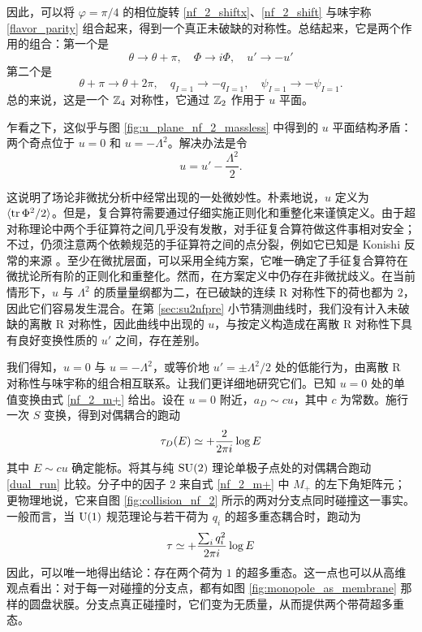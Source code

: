 因此，可以将 $\varphi=\pi/4$ 的相位旋转 \eqref{nf_2_shiftx}、\eqref{nf_2_shift} 与味宇称 \eqref{flavor_parity} 组合起来，得到一个真正未破缺的对称性。总结起来，它是两个作用的组合：第一个是
\begin{equation}
\theta\to\theta+\pi,\quad\Phi\to i\Phi,\quad u'\to-u'
\end{equation}
第二个是
\begin{equation}
\theta+\pi\to\theta+2\pi,\quad q_{I=1}\to-q_{I=1},\quad\psi_{I=1}\to-\psi_{I=1}.
\end{equation}
总的来说，这是一个 $\mathbb{Z}_4$ 对称性，它通过 $\mathbb{Z}_2$ 作用于 $u$ 平面。

乍看之下，这似乎与图 \ref{fig:u_plane_nf_2_massless} 中得到的 $u$ 平面结构矛盾：两个奇点位于 $u=0$ 和 $u=-\Lambda^2$。解决办法是令
\begin{equation}
u=u'-\frac{\Lambda^2}{2}.\label{ushift}
\end{equation}

这说明了场论非微扰分析中经常出现的一处微妙性。朴素地说，$u$ 定义为 $\langle\mathop{\mathrm{tr}}\nolimits\Phi^2/2\rangle$。但是，复合算符需要通过仔细实施正则化和重整化来谨慎定义。由于超对称理论中两个手征算符之间几乎没有发散，对手征复合算符做这件事相对安全；不过，仍须注意两个依赖规范的手征算符之间的点分裂，例如它已知是 Konishi 反常的来源 \cite{Konishi:1983hf}。至少在微扰层面，可以采用全纯方案，它唯一确定了手征复合算符在微扰论所有阶的正则化和重整化。然而，在方案定义中仍存在非微扰歧义。在当前情形下，$u$ 与 $\Lambda^2$ 的质量量纲都为二，在已破缺的连续 R 对称性下的荷也都为 $2$，因此它们容易发生混合。在第 \ref{sec:su2nfpre} 小节猜测曲线时，我们没有计入未破缺的离散 R 对称性，因此曲线中出现的 $u$，与按定义构造成在离散 R 对称性下具有良好变换性质的 $u'$ 之间，存在差别。

我们得知，$u=0$ 与 $u=-\Lambda^2$，或等价地 $u'=\pm\Lambda^2/2$ 处的低能行为，由离散 R 对称性与味宇称的组合相互联系。让我们更详细地研究它们。已知 $u=0$ 处的单值变换由式 \eqref{nf_2_m+} 给出。设在 $u=0$ 附近，$a_D\sim cu$，其中 $c$ 为常数。施行一次 $S$ 变换，得到对偶耦合的跑动
\begin{equation}
\tau_D(E)\simeq+\frac{2}{2\pi i}\log E
\end{equation}
其中 $E\sim cu$ 确定能标。将其与纯 $\mathop{\mathrm{SU}}(2)$ 理论单极子点处的对偶耦合跑动 \eqref{dual_run} 比较。分子中的因子 $2$ 来自式 \eqref{nf_2_m+} 中 $M_+$ 的左下角矩阵元；更物理地说，它来自图 \ref{fig:collision_nf_2} 所示的两对分支点同时碰撞这一事实。一般而言，当 ${\mathrm{U}}(1)$ 规范理论与若干荷为 $q_i$ 的超多重态耦合时，跑动为
\begin{equation}
\tau\simeq+\frac{\sum_iq_i^2}{2\pi i}\log E\label{general_u1_running}
\end{equation}
因此，可以唯一地得出结论：存在两个荷为 $1$ 的超多重态。这一点也可以从高维观点看出：对于每一对碰撞的分支点，都有如图 \ref{fig:monopole_as_membrane} 那样的圆盘状膜。分支点真正碰撞时，它们变为无质量，从而提供两个带荷超多重态。

